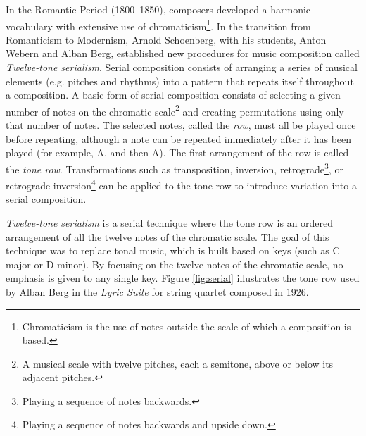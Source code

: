 In the Romantic Period (1800--1850), composers developed a harmonic vocabulary with extensive use of chromaticism\footnote{Chromaticism is the use of notes outside the scale of which a composition is based.}. In the transition from Romanticism to Modernism, Arnold Schoenberg, with his students, Anton Webern and Alban Berg, established new procedures for music composition called \textit{Twelve-tone serialism}. Serial composition consists of arranging a series of musical elements (e.g. pitches and rhythms) into a pattern that repeats itself throughout a composition. A basic form of serial composition consists of selecting a given number of notes on the chromatic scale\footnote{A musical scale with twelve pitches, each a semitone, above or below its adjacent pitches.} and creating permutations using only that number of notes. The selected notes, called the \textit{row}, must all be played once before repeating, although a note can be repeated immediately after it has been played (for example, A, and then A). The first arrangement of the row is called the \textit{tone row}. Transformations such as transposition, inversion, retrograde\footnote{Playing a sequence of notes backwards.}, or retrograde inversion\footnote{Playing a sequence of notes backwards and upside down.} can be applied to the tone row to introduce variation into a serial composition.

\textit{Twelve-tone serialism} is a serial technique where the tone row is an ordered arrangement of all the twelve notes of the chromatic scale. The goal of this technique was to replace tonal music, which is built based on keys (such as C major or D minor). By focusing on the twelve notes of the chromatic scale, no emphasis is given to any single key. Figure \ref{fig:serial} illustrates the tone row used by Alban Berg in the \textit{Lyric Suite} for string quartet composed in 1926.

